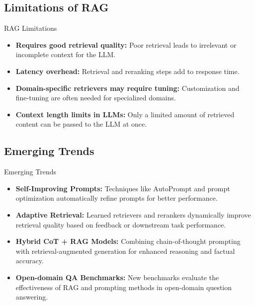 \subsection{Limitations of RAG}
\begin{frame}{RAG Limitations}
    \begin{itemize}
        \setlength{\itemsep}{1em}
        \item \textbf{Requires good retrieval quality:} Poor retrieval leads to irrelevant or incomplete context for the LLM.
        \item \textbf{Latency overhead:} Retrieval and reranking steps add to response time.
        \item \textbf{Domain-specific retrievers may require tuning:} Customization and fine-tuning are often needed for specialized domains.
        \item \textbf{Context length limits in LLMs:} Only a limited amount of retrieved content can be passed to the LLM at once.
    \end{itemize}
\end{frame}


\subsection{Emerging Trends}
\begin{frame}{Emerging Trends}
    \begin{itemize}
        \setlength{\itemsep}{1em}
        \item \textbf{Self-Improving Prompts:} Techniques like AutoPrompt and prompt optimization automatically refine prompts for better performance.
        \item \textbf{Adaptive Retrieval:} Learned retrievers and rerankers dynamically improve retrieval quality based on feedback or downstream task performance.
        \item \textbf{Hybrid CoT + RAG Models:} Combining chain-of-thought prompting with retrieval-augmented generation for enhanced reasoning and factual accuracy.
        \item \textbf{Open-domain QA Benchmarks:} New benchmarks evaluate the effectiveness of RAG and prompting methods in open-domain question answering.
    \end{itemize}
\end{frame}


